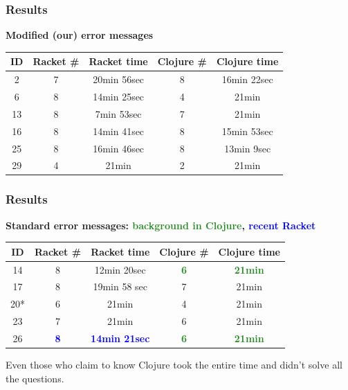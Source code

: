 \documentclass{beamer}
\newcommand{\comment}[1]{{\bf \tt  {#1}}}
\newcommand{\emcomment}[1]{\textcolor{ForestGreen}{\comment{Elena: {#1}}}}
\newcommand{\R}[1]{\textcolor{blue}{\bf {#1}}}
\newcommand{\Cl}[1]{\textcolor{ForestGreen}{\bf {#1}}}
\begin{document}
\begin{frame}
\frametitle{Results}
{\bf Modified (our) error messages}
\vspace{0.1in}

\begin{tabular}{c | c| c| c | c }
\hline
{\bf ID} & {\bf Racket  \#} & {\bf Racket time} & {\bf Clojure  \#} & {\bf Clojure time} \\
\hline 
2 & 7  & 20min 56sec & 8 & 16min 22sec  \\
6 &  8  & 14min 25sec &  4  &  21min \\
13 &  8 & 7min 53sec &  7 &  21min \\
16 &  8  & 14min 41sec &  8  &  15min 53sec \\
25 &  8  & 16min 46sec &  8  &  13min 9sec \\
29 &  4  & 21min &  2  &  21min \\
\hline
\end{tabular}
\end{frame}

\begin{frame}
\frametitle{Results}
{\bf Standard error messages: \Cl{background in Clojure}, \R{recent Racket}}
\vspace{0.1in}

\begin{tabular}{c | c| c| c | c }
\hline
{\bf ID} & {\bf Racket  \#} & {\bf Racket time} & {\bf Clojure \#} & {\bf Clojure time} \\
\hline 
14 &  8 & 12min 20sec &  \Cl{6}  &  \Cl{21min} \\
17 &  8 & 19min 58 sec &  7 &  21min \\
20* &  6 & 21min &  4 &  21min \\
23 &  7 & 21min &  6  &  21min \\
26 &  \R{8} & \R{14min 21sec} &  \Cl{6} &  \Cl{21min} \\
\hline
\end{tabular}
Even those who claim to know Clojure took the entire time and didn't solve all the questions. 

\end{frame}
\end{document}
